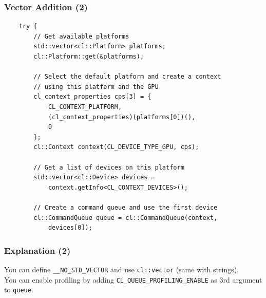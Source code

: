 \begin{frame}[fragile]
  \frametitle{Vector Addition (2)}


  \begin{lstlisting}
    try { 
        // Get available platforms
        std::vector<cl::Platform> platforms;
        cl::Platform::get(&platforms);

        // Select the default platform and create a context
        // using this platform and the GPU
        cl_context_properties cps[3] = { 
            CL_CONTEXT_PLATFORM, 
            (cl_context_properties)(platforms[0])(), 
            0 
        };
        cl::Context context(CL_DEVICE_TYPE_GPU, cps);
 
        // Get a list of devices on this platform
        std::vector<cl::Device> devices =
            context.getInfo<CL_CONTEXT_DEVICES>();
 
        // Create a command queue and use the first device
        cl::CommandQueue queue = cl::CommandQueue(context,
            devices[0]);
  \end{lstlisting}

\end{frame}

\begin{frame}
  \frametitle{Explanation (2)}



    You can define {\tt \_\_NO\_STD\_VECTOR} and use {\tt cl::vector}
      (same with strings).\\[1em]
    You can enable profiling by adding {\tt CL\_QUEUE\_PROFILING\_ENABLE}
      as 3rd argument to {\tt queue}.

\end{frame}

